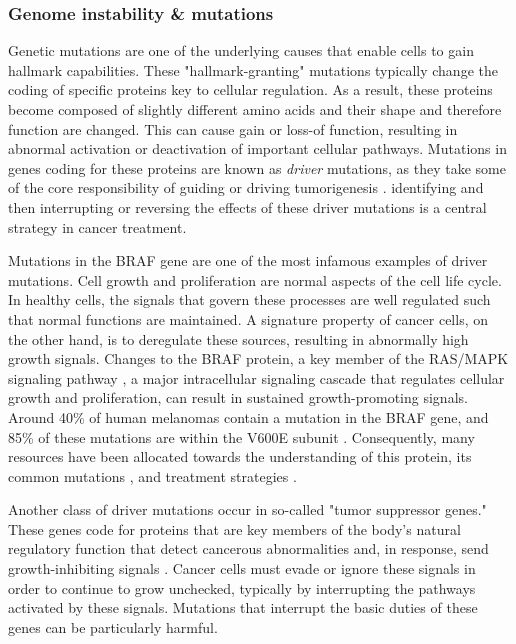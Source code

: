 \subsubsection{Genome instability \& mutations} \label{sec:cancer-mutations}
Genetic mutations are one of the underlying causes that enable cells to gain hallmark capabilities.
These "hallmark-granting" mutations typically change the coding of specific proteins key to cellular regulation.
As a result, these proteins become composed of slightly different amino acids and their shape and therefore function are changed.
This can cause gain or loss-of function, resulting in abnormal activation or deactivation of important cellular pathways.
Mutations in genes coding for these proteins are known as \emph{driver} mutations, as they take some of the core responsibility of guiding or driving tumorigenesis \cite{martinez-jimenez2020}.
identifying and then interrupting or reversing the effects of these driver mutations is a central strategy in cancer treatment.

Mutations in the BRAF gene are one of the most infamous examples of driver mutations.
Cell growth and proliferation are normal aspects of the cell life cycle.
In healthy cells, the signals that govern these processes are well regulated such that normal functions are maintained.
A signature property of cancer cells, on the other hand, is to deregulate these sources, resulting in abnormally high growth signals.
Changes to the BRAF protein, a key member of the RAS/MAPK signaling pathway \cite{davies2011}, a major intracellular signaling cascade that regulates cellular growth and proliferation,
can result in sustained growth-promoting signals.
Around 40\% of human melanomas contain a mutation in the BRAF gene, and 
85\% of these mutations are within the V600E subunit \cite{spathis2019}.
Consequently, many resources have been allocated towards the understanding of this protein, its common mutations \cite{smiech2020}, and treatment strategies \cite{cheng2018}.

Another class of driver mutations occur in so-called "tumor suppressor genes."
These genes code for proteins that are key members of the body's natural regulatory function that detect cancerous abnormalities and, in response, send growth-inhibiting signals \cite{joyce2024}.
Cancer cells must evade or ignore these signals in order to continue to grow unchecked,
typically by interrupting the pathways activated by these signals.
Mutations that interrupt the basic duties of these genes can be particularly harmful.

